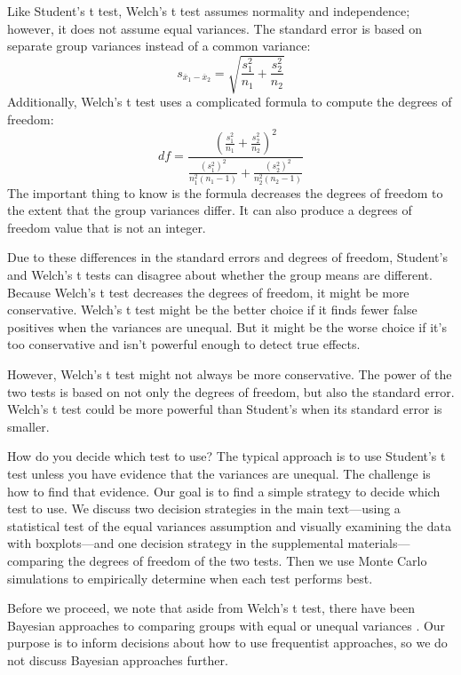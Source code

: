 \documentclass[man, noextraspace, apacite, floatsintext]{apa6}
\begin{document}
        Like Student's t test, Welch's t test assumes normality and 
independence; however, it does not assume equal variances. The standard error is based on separate group variances instead of a 
common variance:
    \begin{equation}
    s_{\overline{x}_1-\overline{x}_2} = \sqrt{\frac{s_1^2}{n_1} + \frac{s_2^2}{n_2}}
    \end{equation}
Additionally, Welch's t test uses a complicated formula to compute the degrees of freedom: 
    \begin{equation}
    df = \frac{(\frac{s_1^2}{n_1} + \frac{s_2^2}{n_2})^2}{\frac{(s_1^2)^2}{n_1^2(n_1-1)} + \frac{(s_2^2)^2}{n_2^2(n_2-1)}}
    \end{equation}
The important thing to know is the formula decreases the degrees of freedom to the extent that the group
variances differ. It can also produce a degrees of freedom value that is not an integer.

Due to these differences in the standard errors and degrees of freedom, Student's and Welch's t tests can disagree about whether the group means are different. Because Welch's t test decreases the degrees of freedom, it might be more conservative. Welch's t test might be the better choice if it finds fewer false positives when the variances are unequal. But it might be the worse choice if it's too conservative and isn't powerful enough to detect true effects. 
        
    However, Welch's t test might not always be more conservative. The power of 
the two tests is based on not only the degrees of freedom, but also the 
standard error.  Welch's t test could be more powerful than 
Student's when its standard error is smaller.
    
    How do you decide which test to use? The typical approach is to use 
Student's t test unless you have evidence that the variances are unequal. The challenge is how to find that evidence. 
Our goal is to find a simple strategy to decide which test to use. We discuss two decision strategies in the main text---using a statistical test of the equal variances assumption and visually examining the data with boxplots---and one decision strategy in the supplemental materials---comparing the degrees of freedom of the two tests. Then we use Monte Carlo simulations to empirically determine when each test performs best.

    Before we proceed, we note that aside from Welch's t test, there have been Bayesian approaches 
to comparing groups with equal or unequal variances \cite{Box1973, Kruschke2013}. Our purpose is to inform decisions about how to use 
frequentist approaches, so we do not discuss
Bayesian approaches further.
\end{document}
